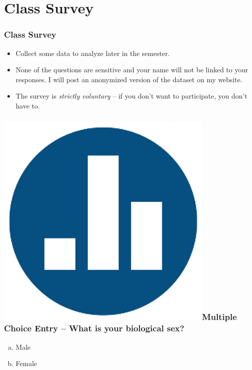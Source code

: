 \section{Class Survey}
\begin{frame}\frametitle{Class Survey}
 
\begin{itemize}
	\item Collect some data to analyze later in the semester.
	\item None of the questions are sensitive and your name will not be linked to your responses. I will post an anonymized version of the dataset on my website.
	\item The survey is \emph{strictly voluntary} -- if you don't want to participate, you don't have to.
\end{itemize}


\end{frame}


\begin{frame}

  \frametitle{\includegraphics[scale = 0.05]{./images/clicker}\hfill  Multiple Choice Entry -- What is your biological sex?}
\begin{enumerate}[(a)]
	\item Male
	\item Female
\end{enumerate}

\end{frame}

